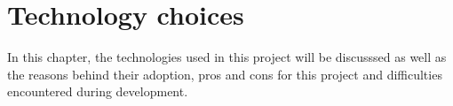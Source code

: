 \chapter{Technology choices}

  In this chapter, the technologies used in this project will be discusssed
  as well as the reasons behind their adoption, pros and cons for this project
  and difficulties encountered during development.

  
  
  
  
